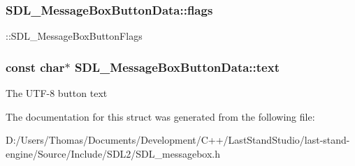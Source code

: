 \subsubsection[{flags}]{ S\+D\+L\+\_\+\+Message\+Box\+Button\+Data\+::flags}\label{structSDL__MessageBoxButtonData_a426c8b5da0e718242c7840706d95de0b}
\+::\+S\+D\+L\+\_\+\+Message\+Box\+Button\+Flags \hypertarget{structSDL__MessageBoxButtonData_af35f3062f0577159284c8828caaf08e4}{}
\subsubsection[{text}]{\setlength{\rightskip}{0pt plus 5cm}const char$\ast$ S\+D\+L\+\_\+\+Message\+Box\+Button\+Data\+::text}\label{structSDL__MessageBoxButtonData_af35f3062f0577159284c8828caaf08e4}
The U\+T\+F-\/8 button text 

The documentation for this struct was generated from the following file\+:\begin{DoxyCompactItemize}
\item 
D\+:/\+Users/\+Thomas/\+Documents/\+Development/\+C++/\+Last\+Stand\+Studio/last-\/stand-\/engine/\+Source/\+Include/\+S\+D\+L2/S\+D\+L\+\_\+messagebox.\+h\end{DoxyCompactItemize}
